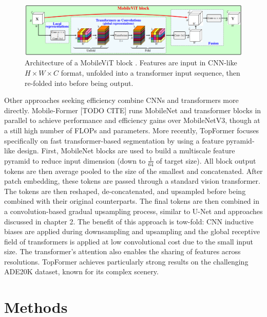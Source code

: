 \documentclass[a4paper,12pt]{report}
\begin{document}
\begin{figure}[ht!]
    \centering
    \includegraphics[width=\textwidth]{res/mobilevit-block.png}
    \caption{Architecture of a MobileViT block \cite{mehta_mobilevit_2022}. Features are input in CNN-like $H \times W \times C$ format, unfolded into a transformer input sequence, then re-folded into before being output.}
    \label{fig:mobilevit_block}
\end{figure}

Other approaches seeking efficiency combine CNNs and transformers more directly. Mobile-Former [TODO CITE] runs MobileNet and transformer blocks in parallel to achieve performance and efficiency gains over MobileNetV3, though at a still high number of FLOPs and parameters. More recently, TopFormer \cite{zhang_topformer_2022} focuses specifically on fast transformer-based segmentation by using a feature pyramid-like design. First, MobileNet blocks are used to build a multiscale feature pyramid to reduce input dimension (down to $\frac{1}{64}$ of target size). All block output tokens are then average pooled to the size of the smallest and concatenated. After patch embedding, these tokens are passed through a standard vision transformer. The tokens are then reshaped, de-concatenated, and upsampled before being combined with their original counterparts. The final tokens are then combined in a convolution-based gradual upsampling process, similar to U-Net \cite{ronneberger_u-net_2015} and approaches discussed in chapter 2. The benefit of this approach is tow-fold: CNN inductive biases are applied during downsampling and upsampling and the global receptive field of transformers is applied at low convolutional cost due to the small input size. The transformer's attention also enables the sharing of features across resolutions. TopFormer achieves particularly strong results on the challenging ADE20K dataset, known for its complex scenery.


\section{Methods}
\end{document}
